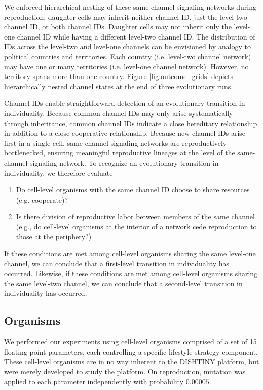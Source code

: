 We enforced hierarchical nesting of these same-channel signaling networks during reproduction:
daughter cells may inherit neither channel ID, just the level-two channel ID, or both channel IDs.
Daughter cells may not inherit only the level-one channel ID while having a different level-two channel ID.
The distribution of IDs across the level-two and level-one channels can be envisioned by analogy to political countries and territories.
Each country (i.e. level-two channel network) may have one or many territories (i.e. level-one channel network).
However, no territory spans more than one country.
Figure \ref{fig:outcome_grids} depicts hierarchically nested channel states at the end of three evolutionary runs.

Channel IDs enable straightforward detection of an evolutionary transition in individuality.
Because common channel IDs may only arise systematically through inheritance, common channel IDs indicate a close hereditary relationship in addition to a close cooperative relationship.
Because new channel IDs arise first in a single cell, same-channel signaling networks are reproductively bottlenecked, ensuring meaningful reproductive lineages at the level of the same-channel signaling network.
To recognize an evolutionary transition in individuality, we therefore evaluate
\begin{enumerate}
\item Do cell-level organisms with the same channel ID choose to share resources (e.g. cooperate)?
\item Is there division of reproductive labor between members of the same channel (e.g., do cell-level organisms at the interior of a network cede reproduction to those at the periphery?)
\end{enumerate}
If these conditions are met among cell-level organisms sharing the same level-one channel, we can conclude that a first-level transition in individuality has occurred.
Likewise, if these conditions are met among cell-level organisms sharing the same level-two channel, we can conclude that a second-level transition in individuality has occurred.

\subsection{Organisms}

We performed our experiments using cell-level organisms comprised of a set of 15 floating-point parameters, each controlling a specific lifestyle strategy component.
These cell-level organisms are in no way inherent to the DISHTINY platform, but were merely developed to study the platform.
On reproduction, mutation was applied to each parameter independently with probability $0.00005$.

